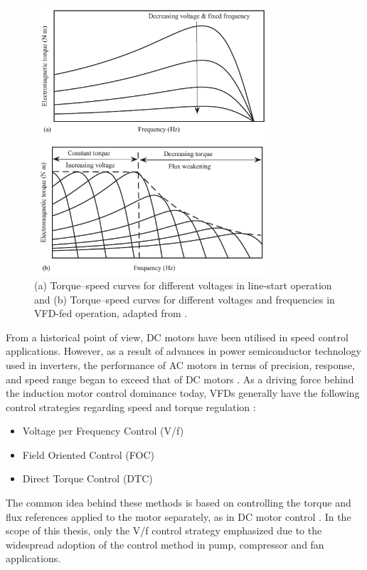 \begin{figure}[h]
	\centering
	\includegraphics[width=250pt,keepaspectratio=true]{./fig/vfd.PNG}
	\caption{(a) Torque–speed curves for different voltages in line-start operation and (b) Torque–speed curves for different voltages and frequencies in VFD-fed operation, adapted from \cite{faiz2017fault}.}	
	\label{vfd}
\end{figure}

From a historical point of view, DC motors have been utilised in speed control applications. However, as a result of advances in power semiconductor technology used in inverters, the performance of AC motors in terms of precision, response, and speed range began to exceed that of DC motors \cite{doe2008improving,mikami2011historical}. As a driving force behind the induction motor control dominance today, VFDs generally have the following control strategies regarding speed and torque regulation \cite{weg,danfoss}:

\begin{itemize}
	\item Voltage per Frequency Control (V/f)
	\item Field Oriented Control (FOC)
	\item Direct Torque Control (DTC)
\end{itemize}

The common idea behind these methods is based on controlling the torque and flux references applied to the motor separately, as in DC motor control \cite{faiz2017fault}. In the scope of this thesis, only the V/f control strategy emphasized due to the widespread adoption of the control method in pump, compressor and fan applications. 

